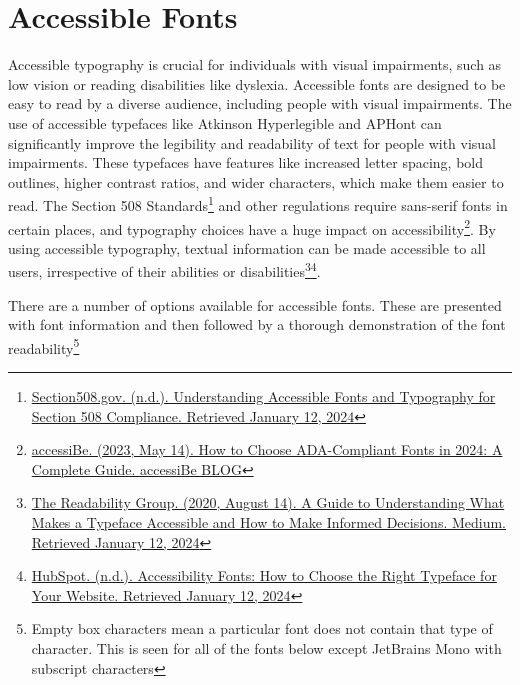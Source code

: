 \chapter{Accessible Fonts}\label{appx66}
\begin{raggedright}
Accessible typography is crucial for individuals with visual impairments, such as low vision or reading disabilities like dyslexia. Accessible fonts are designed to be easy to read by a diverse audience, including people with visual impairments. The use of accessible typefaces like Atkinson Hyperlegible and APHont can significantly improve the legibility and readability of text for people with visual impairments. These typefaces have features like increased letter spacing, bold outlines, higher contrast ratios, and wider characters, which make them easier to read. The Section 508 Standards\footnote{\raggedright \href{https://blog.hubspot.com/website/accessibility-fonts}{Section508.gov. (n.d.). Understanding Accessible Fonts and Typography for Section 508 Compliance. Retrieved January 12, 2024}} and other regulations require sans-serif fonts in certain places, and typography choices have a huge impact on accessibility\footnote{\raggedright \href{https://accessibe.com/blog/knowledgebase/ada-compliant-fonts}{accessiBe. (2023, May 14). How to Choose ADA-Compliant Fonts in 2024: A Complete Guide. accessiBe BLOG}}. By using accessible typography, textual information can be made accessible to all users, irrespective of their abilities or disabilities\footnote{\raggedright \href{https://medium.com/the-readability-group/a-guide-to-understanding-what-makes-a-typeface-accessible-and-how-to-make-informed-decisions-9e5c0b9040a0}{The Readability Group. (2020, August 14). A Guide to Understanding What Makes a Typeface Accessible and How to Make Informed Decisions. Medium. Retrieved January 12, 2024}}\footnote{\raggedright \href{https://blog.hubspot.com/website/accessibility-fonts}{HubSpot. (n.d.). Accessibility Fonts: How to Choose the Right Typeface for Your Website. Retrieved January 12, 2024}}.

There are a number of options available for accessible fonts. These are presented with font information and then followed by a thorough demonstration of the font readability\footnote{\raggedright Empty box characters mean a particular font does not contain that type of character. This is seen for all of the fonts below except JetBrains Mono with subscript characters}
\end{raggedright}


